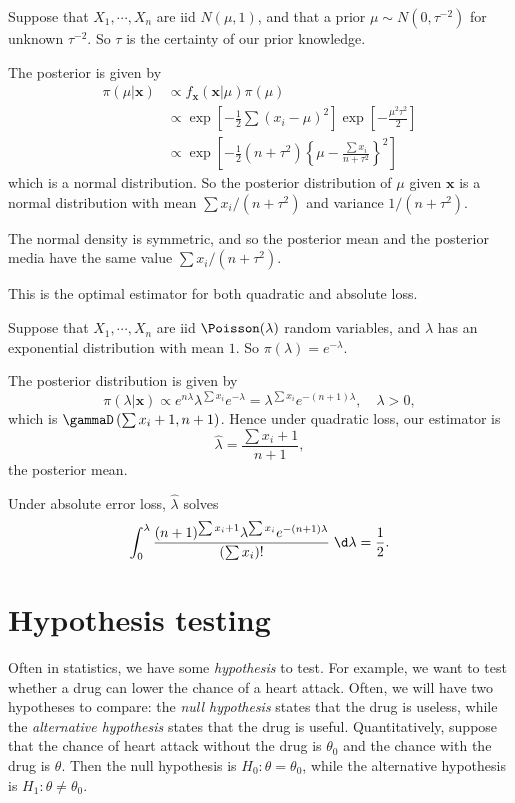 \documentclass[a4paper]{article}
\begin{document}
\begin{eg}
  Suppose that $X_1, \cdots , X_n$ are iid $N(\mu, 1)$, and that a prior $\mu\sim N(0, \tau^{-2})$ for unknown $\tau^{-2}$. So $\tau$ is the certainty of our prior knowledge.

  The posterior is given by
  \begin{align*}
    \pi(\mu|\mathbf{x})&\propto f_\mathbf{x}(\mathbf{x}|\mu)\pi(\mu)\\
    &\propto \exp\left[-\frac{1}{2}\sum(x_i - \mu)^2\right]\exp\left[-\frac{\mu^2\tau^2}{2}\right]\\
    &\propto \exp\left[-\frac{1}{2}(n + \tau^2)\left\{\mu - \frac{\sum x_i}{n + \tau^2}\right\}^2\right]
  \end{align*}
  which is a normal distribution. So the posterior distribution of $\mu$ given $\mathbf{x}$ is a normal distribution with mean $\sum x_i/(n + \tau^2)$ and variance $1/(n + \tau^2)$.

  The normal density is symmetric, and so the posterior mean and the posterior media have the same value $\sum x_i/(n + \tau^2)$.

  This is the optimal estimator for both quadratic and absolute loss.
\end{eg}

\begin{eg}
  Suppose that $X_1, \cdots, X_n$ are iid $\Poisson(\lambda)$ random variables, and $\lambda$ has an exponential distribution with mean $1$. So $\pi(\lambda) = e^{-\lambda}.$

  The posterior distribution is given by
  \[
    \pi(\lambda|\mathbf{x}) \propto e^{n\lambda} \lambda^{\sum x_i}e^{-\lambda} = \lambda^{\sum x_i}e^{-(n + 1)\lambda},\quad \lambda > 0,
  \]
  which is $\gammaD\left(\sum x_i + 1, n + 1\right)$. Hence under quadratic loss, our estimator is
  \[
    \hat{\lambda} = \frac{\sum x_i + 1}{n + 1},
  \]
  the posterior mean.

  Under absolute error loss, $\hat{\lambda}$ solves
  \[
    \int_0^{\lambda} \frac{(n + 1)^{\sum x_i + 1}\lambda^{\sum x_i}e ^{-(n + 1)\lambda}}{(\sum x_i)!}\;\d \lambda = \frac{1}{2}.
  \]
\end{eg}

\section{Hypothesis testing}
Often in statistics, we have some \emph{hypothesis} to test. For example, we want to test whether a drug can lower the chance of a heart attack. Often, we will have two hypotheses to compare: the \emph{null hypothesis} states that the drug is useless, while the \emph{alternative hypothesis} states that the drug is useful. Quantitatively, suppose that the chance of heart attack without the drug is $\theta_0$ and the chance with the drug is $\theta$. Then the null hypothesis is $H_0: \theta = \theta_0$, while the alternative hypothesis is $H_1: \theta \not= \theta_0$.
\end{document}
